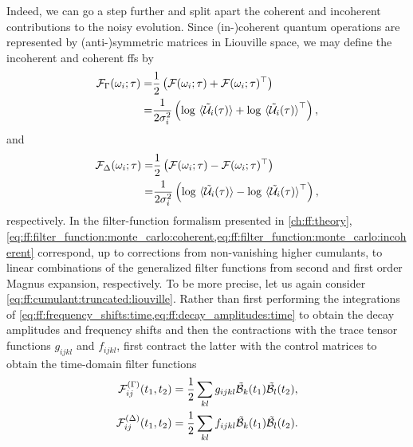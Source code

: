 Indeed, we can go a step further and split apart the coherent and incoherent contributions to the noisy evolution.
Since (in-)coherent quantum operations are represented by (anti-)symmetric matrices in Liouville space, we may define the incoherent and coherent \glspl{ff} by
\begin{equation}\label{eq:ff:filter_function:monte_carlo:incoherent}
    \begin{split}
        \mc{F}_\decayamps(\omega_i;\tau) =& \frac{1}{2}\left(\mc{F}(\omega_i;\tau) + \mc{F}(\omega_i;\tau)\transpose\right) \\
                                         =& \frac{1}{2\sigma_i^2}\left(\log\ev*{\liouvUe_i(\tau)} + \log\ev*{\liouvUe_i(\tau)}\transpose\right),
    \end{split}
\end{equation}
and
\begin{equation}\label{eq:ff:filter_function:monte_carlo:coherent}
    \begin{split}
        \mc{F}_\freqshifts(\omega_i;\tau) =& \frac{1}{2}\left(\mc{F}(\omega_i;\tau) - \mc{F}(\omega_i;\tau)\transpose\right) \\
                                          =& \frac{1}{2\sigma_i^2}\left(\log\ev*{\liouvUe_i(\tau)} - \log\ev*{\liouvUe_i(\tau)}\transpose\right),
    \end{split}
\end{equation}
respectively.
In the filter-function formalism presented in \cref{ch:ff:theory}, \cref{eq:ff:filter_function:monte_carlo:coherent,eq:ff:filter_function:monte_carlo:incoherent} correspond, up to corrections from non-vanishing higher cumulants, to linear combinations of the generalized filter functions from second and first order Magnus expansion, respectively.
To be more precise, let us again consider \cref{eq:ff:cumulant:truncated:liouville}.
Rather than first performing the integrations of \cref{eq:ff:frequency_shifts:time,eq:ff:decay_amplitudes:time} to obtain the decay amplitudes \decayamps and frequency shifts \freqshifts and then the contractions with the trace tensor functions $g_{ijkl}$ and $f_{ijkl}$, first contract the latter with the control matrices to obtain the time-domain filter functions
\begin{align}
    \mathcal{F}^{(\Gamma)}_{ij}(t_1, t_2) &= \frac{1}{2}\sum_{kl} g_{ijkl}\tilde{\mathcal{B}}_{k}(t_1)\tilde{\mathcal{B}}_{l}(t_2), \label{eq:ff:filter_function:cumulant:incoherent}\\
    \mathcal{F}^{(\Delta)}_{ij}(t_1, t_2) &= \frac{1}{2}\sum_{kl} f_{ijkl}\tilde{\mathcal{B}}_{k}(t_1)\tilde{\mathcal{B}}_{l}(t_2). \label{eq:ff:filter_function:cumulant:coherent}
\end{align}

